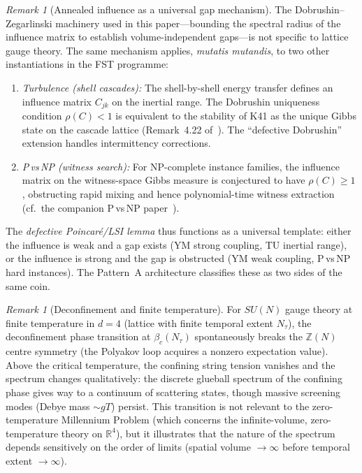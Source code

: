 \documentclass[12pt,a4paper]{article}
\theoremstyle{definition}
\theoremstyle{plain}
\theoremstyle{remark}
\newtheorem{remark}[definition]{Remark}
\begin{document}
\begin{remark}[Annealed influence as a universal gap mechanism]
\label{rem:annealed-influence-universal}
The Dobrushin--Zegarlinski machinery used in this paper---bounding the spectral radius of the influence matrix to establish volume-independent gaps---is not specific to lattice gauge theory. The same mechanism applies, \emph{mutatis mutandis}, to two other instantiations in the FST programme:
\begin{enumerate}
\item \emph{Turbulence (shell cascades):} The shell-by-shell energy transfer defines an influence matrix $C_{jk}$ on the inertial range. The Dobrushin uniqueness condition $\rho(C) < 1$ is equivalent to the stability of K41 as the unique Gibbs state on the cascade lattice (Remark~4.22 of~\cite{Geiger2026-TU}). The ``defective Dobrushin'' extension handles intermittency corrections.
\item \emph{P\,vs\,NP (witness search):} For NP-complete instance families, the influence matrix on the witness-space Gibbs measure is conjectured to have $\rho(C) \geq 1$, obstructing rapid mixing and hence polynomial-time witness extraction (cf.\ the companion P\,vs\,NP paper~\cite{Geiger2026-PvsNP}).
\end{enumerate}
The \emph{defective Poincar\'{e}/LSI lemma} thus functions as a universal template: either the influence is weak and a gap exists (YM strong coupling, TU inertial range), or the influence is strong and the gap is obstructed (YM weak coupling, P\,vs\,NP hard instances). The Pattern~A architecture classifies these as two sides of the same coin.
\end{remark}

\begin{remark}[Deconfinement and finite temperature]
For $SU(N)$ gauge theory at finite temperature in $d = 4$ (lattice with finite temporal extent $N_\tau$), the deconfinement phase transition at $\beta_c(N_\tau)$ spontaneously breaks the $\mathbb{Z}(N)$ centre symmetry (the Polyakov loop acquires a nonzero expectation value). Above the critical temperature, the confining string tension vanishes and the spectrum changes qualitatively: the discrete glueball spectrum of the confining phase gives way to a continuum of scattering states, though massive screening modes (Debye mass $\sim gT$) persist. This transition is not relevant to the zero-temperature Millennium Problem (which concerns the infinite-volume, zero-temperature theory on $\mathbb{R}^4$), but it illustrates that the nature of the spectrum depends sensitively on the order of limits (spatial volume $\to \infty$ before temporal extent $\to \infty$).
\end{remark}
\end{document}
